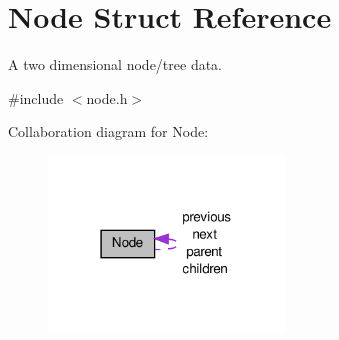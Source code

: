 \hypertarget{structNode}{\section{Node Struct Reference}
\label{structNode}
}


A two dimensional node/tree data.  




{\ttfamily \#include $<$node.\-h$>$}



Collaboration diagram for Node\-:\nopagebreak
\begin{figure}[H]
\begin{center}
\leavevmode
\includegraphics[width=178pt]{structNode__coll__graph}
\end{center}
\end{figure}
